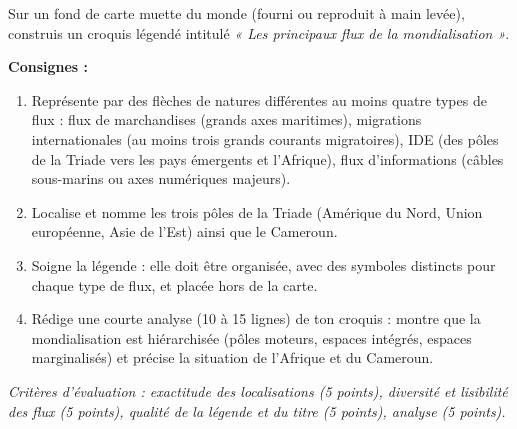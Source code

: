 \documentclass[11pt]{article}
\begin{document}
\begin{exercice}
Sur un fond de carte muette du monde (fourni ou reproduit à main levée), construis un croquis légendé intitulé \emph{« Les principaux flux de la mondialisation »}.

\textbf{Consignes :}
\begin{enumerate}
\item Représente par des flèches de natures différentes au moins quatre types de flux : flux de marchandises (grands axes maritimes), migrations internationales (au moins trois grands courants migratoires), IDE (des pôles de la Triade vers les pays émergents et l'Afrique), flux d'informations (câbles sous-marins ou axes numériques majeurs).
\item Localise et nomme les trois pôles de la Triade (Amérique du Nord, Union européenne, Asie de l'Est) ainsi que le Cameroun.
\item Soigne la légende : elle doit être organisée, avec des symboles distincts pour chaque type de flux, et placée hors de la carte.
\item Rédige une courte analyse (10 à 15 lignes) de ton croquis : montre que la mondialisation est hiérarchisée (pôles moteurs, espaces intégrés, espaces marginalisés) et précise la situation de l'Afrique et du Cameroun.
\end{enumerate}
\emph{Critères d'évaluation : exactitude des localisations (5 points), diversité et lisibilité des flux (5 points), qualité de la légende et du titre (5 points), analyse (5 points).}
\end{exercice}
\end{document}
